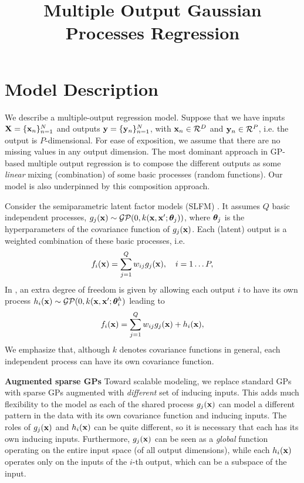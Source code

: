 \documentclass{article} %
\title{Multiple Output Gaussian Processes Regression}
\begin{document}
\maketitle
\linenumbers

\section{Model Description}
We describe a multiple-output regression model.
Suppose that we have inputs $\mathbf{X} = \{\mathbf{x}_n\}_{n=1}^N$ and outputs $\mathbf{y} = \{\mathbf{y}_n\}_{n=1}^N$, with $\mathbf{x}_n \in \mathcal{R}^D$ and $\mathbf{y}_n \in \mathcal{R}^P$, i.e. the output is $P$-dimensional.
For ease of exposition, we assume that there are no missing values in any output dimension.
The most dominant approach in GP-based multiple output regression is to compose the different outputs as some \textit{linear} mixing (combination) of some basic processes (random functions).
Our model is also underpinned by this composition approach.

\noindent Consider the semiparametric latent factor models (SLFM) \cite{teh-et-al-aistats-05}.
It assumes $Q$ basic independent processes, $g_j(\mathbf{x}) \sim \mathcal{GP}(0, k(\mathbf{x},\mathbf{x}';\boldsymbol{ \theta }_j))$, where $\boldsymbol{ \theta }_j$ is the hyperparameters of the covariance function of $g_j(\mathbf{x})$.
Each (latent) output is a weighted combination of these basic processes, i.e.
\begin{align}
f_i(\mathbf{x}) = \sum_{j=1}^Q w_{ij} g_j(\mathbf{x}), \quad i = 1 \hdots P,
\end{align}
In \cite{seeger2005semiparametric}, an extra degree of freedom is given by allowing each output $i$ to have its own process $h_i(\mathbf{x}) \sim \mathcal{GP}(0, k(\mathbf{x},\mathbf{x}'; \boldsymbol{ \theta }^h_i)$ leading to
\begin{align}
f_i(\mathbf{x}) = \sum_{j=1}^Q w_{ij} g_j(\mathbf{x}) + h_i(\mathbf{x}), 
\end{align}
We emphasize that, although $k$ denotes covariance functions in general, each independent process can have its own covariance function.

\noindent 
\textbf{Augmented sparse GPs}
Toward scalable modeling, we replace standard GPs with sparse GPs augmented with \textit{different} set of inducing inputs.
This adds much flexibility to the model as each of the shared process $g_j(\mathbf{x})$ can model a different pattern in the data with its own covariance function and inducing inputs. The roles of $g_j(\mathbf{x})$ and $h_i(\mathbf{x})$ can be quite different, so it is necessary that each has its own inducing inputs.
Furthermore, $g_j(\mathbf{x})$ can be seen as a \textit{global} function operating on the entire input space (of all output dimensions), while each $h_i(\mathbf{x})$ operates only on the inputs of the $i$-th output, which can be a subspace of the input.
\end{document}
